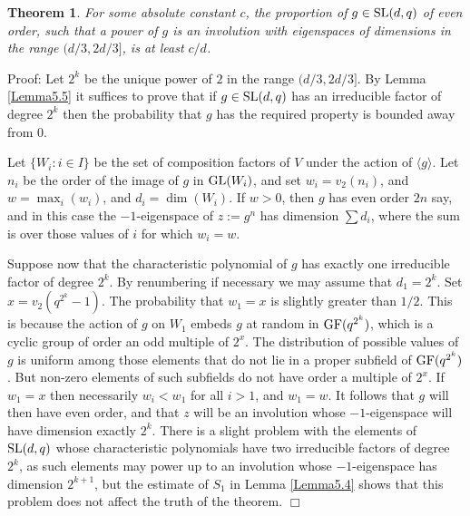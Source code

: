 \documentclass[12pt]{article}
\newtheorem{theorem}[definition]{Theorem}
\newenvironment{proof}{\normalsize {\sc Proof}:}{{\hfill $\Box$ \\}}
\def\SL{{\rm SL}}
\def\GL{{\rm GL}}
\def\GF{{\rm GF}}
\begin{document}
\begin{theorem}\label{Theorem5.1}  
For some absolute constant $c$, the proportion
of $g \in \SL(d,q)$ of even order, such that a power of $g$
is an involution with eigenspaces of dimensions in the range
$(d/3,2d/3]$, is at least $c/d$.
\end{theorem}
\begin{proof} 
Let $2^k$ be the unique power of $2$ in the range
$(d/3,2d/3]$. By Lemma \ref{Lemma5.5} it suffices to prove that 
if $g\in\SL(d,q)$
has an  irreducible factor of degree $2^k$ then the probability that
$g$ has the required property is bounded away from 0.

Let $\{W_i:i\in I\}$ be the set of composition factors of $V$
under the action of $\langle g\rangle$. Let $n_i$ be the order of the
image of $g$ in $\GL(W_i)$, and set $w_i=v_2(n_i)$, and
$w=\max_i(w_i)$, and $d_i=\dim(W_i)$. 
If $w>0$, then $g$ has even order $2n$  say,
and in  this case the $-1$-eigenspace of $z :=  g^n$ has
dimension $\sum d_i$, where the sum is over those values of $i$ for
which $w_i=w$. 

Suppose now that the characteristic polynomial of $g$
has exactly one irreducible factor of degree $2^k$. By renumbering if
necessary we may assume that $d_1=2^k$. Set $x=v_2(q^{2^k}-1)$.  The
probability that $w_1=x$ is slightly greater than $1/2$. This is
because the action of $g$ on $W_1$ embeds $g$ at random in
$\GF(q^{2^k})$, which is a cyclic group of order an odd multiple of
$2^x$. The distribution of possible values of $g$ is uniform among
those elements that do not lie in a proper subfield of $\GF(q^{2^k})$.
But non-zero elements of such subfields do not have order a multiple
of $2^x$. If $w_1=x$ then necessarily $w_i<w_1$ for all $i>1$,
and $w_1=w$. It follows that $g$ will then have even order, and that
$z$ will be an involution whose $-1$-eigenspace will have
dimension exactly $2^k$. There is a slight problem with the elements of $\SL(d,q)$
whose characteristic polynomials have two irreducible factors of
degree $2^k$, as such elements may power up to an involution
whose  $-1$-eigenspace has dimension $2^{k+1}$, but the estimate of $S_1$
in Lemma \ref{Lemma5.4} shows that this problem does not affect the truth of the theorem.
\end{proof}
\end{document}
